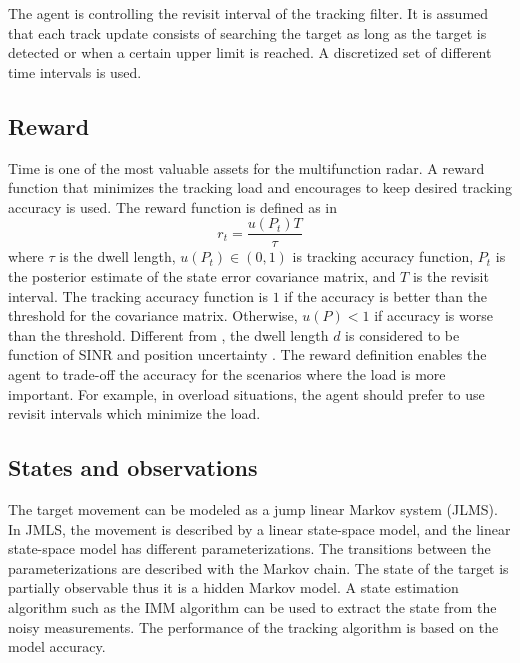 \documentclass[11pt,a4paper]{article}
\begin{document}
The agent is controlling the revisit interval of the tracking filter.
It is assumed that each track update consists of searching the target as long as the target is detected or
when a certain upper limit is reached.
A discretized set of different time intervals is used.

\subsection{Reward}

Time is one of the most valuable assets for the multifunction radar.
A reward function that minimizes the tracking load and encourages to keep desired tracking accuracy is used.
The reward function is defined as in \cite{Charlish2015}
\begin{equation}
    r_t = \frac{u(P_t) T}{\tau}
\end{equation}
where $\tau$ is the dwell length, $u(P_t) \in (0, 1)$ is tracking accuracy function, $P_t$ is the posterior estimate of the  state error covariance matrix, and $T$ is the revisit interval.
The tracking accuracy function is $1$ if the accuracy is better than the threshold for the covariance matrix.
Otherwise, $u(P) < 1$ if accuracy is worse than the threshold.
Different from \cite{Charlish2015}, the dwell length $d$ is considered to be function of SINR and position uncertainty \cite{vanKeuk1993}.
The reward definition enables the agent to trade-off the accuracy for the scenarios where the load is more important.
For example, in overload situations, the agent should prefer to use revisit intervals which minimize the load.


\subsection{States and observations}

The target movement can be modeled as a jump linear Markov system (JLMS).
In JMLS, the movement is described by a linear state-space model, and the linear state-space model has different parameterizations.
The transitions between the parameterizations are described with the Markov chain.
The state of the target is partially observable thus it is a hidden Markov model.
A state estimation algorithm such as the IMM algorithm can be used to extract the state from the noisy measurements.
The performance of the tracking algorithm is based on the model accuracy.
\end{document}
